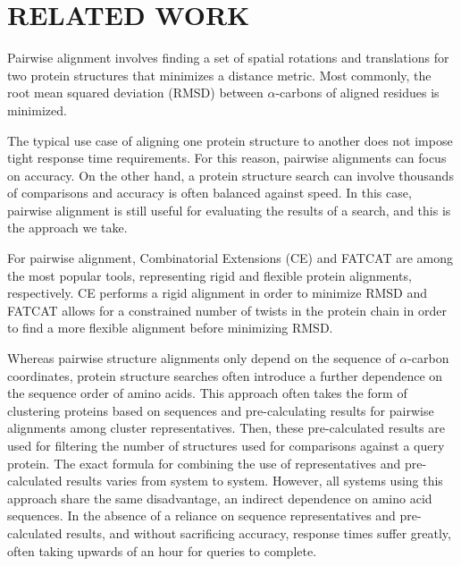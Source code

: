 \documentclass[letter,center,fleqn]{NAR}
\newcommand{\ca}{$\alpha$-carbon\xspace}
\newcommand{\cas}{$\alpha$-carbons\xspace}
\begin{document}
\enlargethispage{-65.1pt}

\section{RELATED WORK}

Pairwise alignment involves finding a set of spatial rotations and translations for two protein structures that minimizes a distance metric. 
Most commonly, the root mean squared deviation (RMSD) between \cas of aligned residues is minimized.

The typical use case of aligning one protein structure to another does not impose tight response time requirements. 
For this reason, pairwise alignments can focus on accuracy. 
On the other hand, a protein structure search can involve thousands of comparisons and accuracy is often balanced against speed. 
In this case, pairwise alignment is still useful for evaluating the results of a search, and this is the approach we take. 

For pairwise alignment, Combinatorial Extensions (CE) \cite{Shindyalov1998} and FATCAT \cite{Ye2003} are among the most popular tools, representing rigid and flexible protein alignments, respectively. 
CE performs a rigid alignment in order to minimize RMSD and FATCAT allows for a constrained number of twists in the protein chain in order to find a more flexible alignment before minimizing RMSD.

Whereas pairwise structure alignments only depend on the sequence of \ca coordinates, protein structure searches often introduce a further dependence on the sequence order of amino acids.
This approach often takes the form of clustering proteins based on sequences and pre-calculating results for pairwise alignments among cluster representatives. 
Then, these pre-calculated results are used for filtering the number of structures used for comparisons against a query protein.
The exact formula for combining the use of representatives and pre-calculated results varies from system to system.
However, all systems using this approach share the same disadvantage, an indirect dependence on amino acid sequences. 
In the absence of a reliance on sequence representatives and pre-calculated results, and without sacrificing accuracy, response times suffer greatly, often taking upwards of an hour for queries to complete. 
\end{document}
